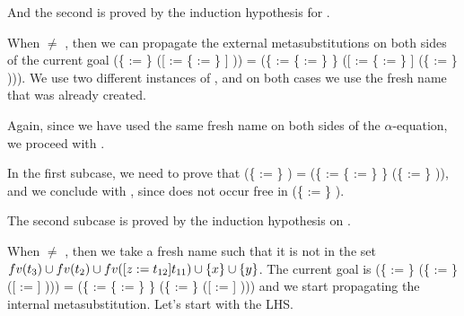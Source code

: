 And the second is proved by the induction hypothesis for .
\begin{coqdoccode}
\end{coqdoccode}
When  \ensuremath{\not=} , then we can propagate the external metasubstitutions on both sides of the current goal (\{ := \} ([ := \{ := \} ] )) = (\{ := \{ := \} \} ([ := \{ := \} ] (\{ := \}    ))). We use two different instances of , and on both cases we use the fresh name  that was already created.\begin{coqdoccode}
 \end{coqdoccode}
Again, since we have used the same fresh name  on both sides of the $\alpha$-equation, we proceed with .
\begin{coqdoccode}
\end{coqdoccode}
In the first subcase, we need to prove that (\{ := \}    ) = (\{ := \{ := \} \} (\{ := \}    )), and we conclude with , since  does not occur free in (\{ := \}    ).\begin{coqdoccode}
 \end{coqdoccode}
The second subcase is proved by the induction hypothesis on .
\begin{coqdoccode}
\end{coqdoccode}
When  \ensuremath{\not=} , then we take a fresh name  such that it is not in the set $fv(t_3)\cup fv(t_2) \cup fv(\esub{t_{11}}{z}{t_{12}})\cup \{x\} \cup \{y\}$. The current goal is (\{ := \} (\{ := \} ([ := ] ))) = (\{ := \{ := \} \} (\{ := \} ([ := ] ))) and we start propagating the internal metasubstitution. Let's start with the LHS.\begin{coqdoccode}
 \end{coqdoccode}

